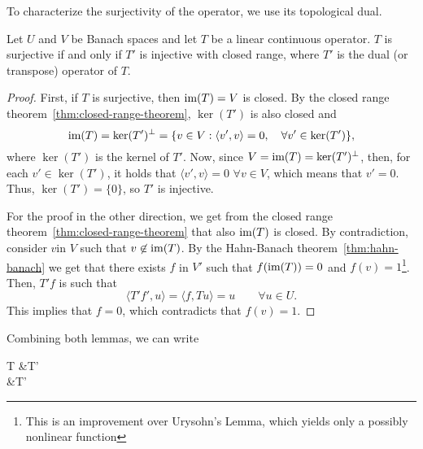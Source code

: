 To characterize the surjectivity of the operator, we use its topological dual.
\begin{lemma}
    Let $U$ and $V$ be Banach spaces and let $T$ be a linear continuous operator. $T$ is surjective if and only if $T'$ is injective with closed range, where $T'$ is the dual (or transpose) operator of $T$.
    \begin{proof}
        First, if $T$ is surjective, then $\operatorname{\text{im}} (T) = V$ is closed. By the closed range theorem~\ref{thm:closed-range-theorem}, $\ker(T')$ is also closed and 
        \begin{equation}
            \operatorname{\text{im}} (T) = \ker (T')^\bot = 
            \{v\in V: \langle v', v\rangle = 0,\quad \forall v' \in \ker(T')\},
        \end{equation}
        where $\ker(T')$ is the kernel of $T'$. Now, since $V = \operatorname{\text{im}}(T) = \ker(T')^\bot$, then, for each $v' \in \ker(T')$, it holds that $ \langle v', v\rangle = 0$ $\forall v \in V$, which means that $v' = 0$. Thus, $\ker(T') = \{0\}$, so $T'$ is injective.

        For the proof in the other direction, we get from the closed range theorem~\ref{thm:closed-range-theorem} that also $\operatorname{\text{im}}(T)$ is closed. By contradiction, consider $v$in $V$ such that $v\not\in \operatorname{\text{im}}(T)$. By the Hahn-Banach theorem~\ref{thm:hahn-banach} we get that there exists $f$ in $V'$ such that $f(\operatorname{\text{im}}(T)) = 0$ and $f(v)=1$\footnote{This is an improvement over Urysohn's Lemma, which yields only a possibly nonlinear function}. Then, $T'f$ is such that
        \begin{equation*}
            \langle T'f', u\rangle = \langle f, Tu\rangle = u \qquad \forall u\in U.
        \end{equation*}
        This implies that $f=0$, which contradicts that $f(v)=1$. 
    \end{proof}
\end{lemma}
Combining both lemmas, we can write
\begin{tightalign*}
    T 
    &\Longleftrightarrow T'
    \\&\Longleftrightarrow T'
\end{tightalign*}

